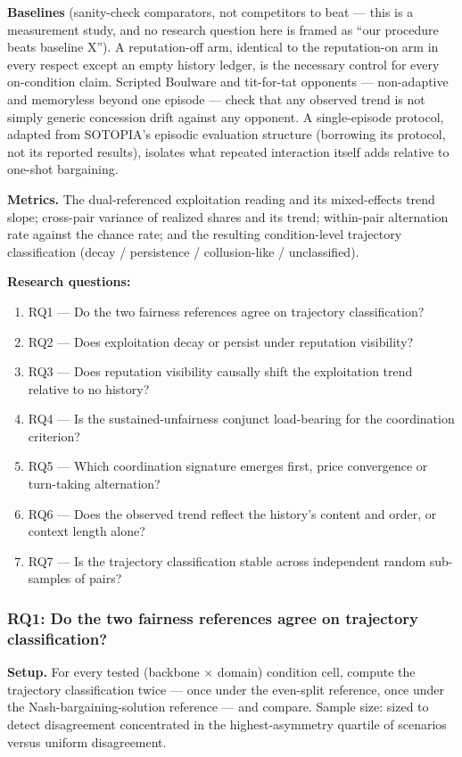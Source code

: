 \documentclass[11pt]{article}
\begin{document}
\textbf{Baselines} (sanity-check comparators, not competitors to beat --- this is a measurement study, and no research question here is framed as ``our procedure beats baseline X''). A reputation-off arm, identical to the reputation-on arm in every respect except an empty history ledger, is the necessary control for every on-condition claim. Scripted Boulware and tit-for-tat opponents --- non-adaptive and memoryless beyond one episode --- check that any observed trend is not simply generic concession drift against any opponent. A single-episode protocol, adapted from SOTOPIA's \citep{sotopia} episodic evaluation structure (borrowing its protocol, not its reported results), isolates what repeated interaction itself adds relative to one-shot bargaining.

\textbf{Metrics.} The dual-referenced exploitation reading and its mixed-effects trend slope; cross-pair variance of realized shares and its trend; within-pair alternation rate against the chance rate; and the resulting condition-level trajectory classification (decay / persistence / collusion-like / unclassified).

\textbf{Research questions:}
\begin{enumerate}[leftmargin=1.6em]
\item RQ1 --- Do the two fairness references agree on trajectory classification?
\item RQ2 --- Does exploitation decay or persist under reputation visibility?
\item RQ3 --- Does reputation visibility causally shift the exploitation trend relative to no history?
\item RQ4 --- Is the sustained-unfairness conjunct load-bearing for the coordination criterion?
\item RQ5 --- Which coordination signature emerges first, price convergence or turn-taking alternation?
\item RQ6 --- Does the observed trend reflect the history's content and order, or context length alone?
\item RQ7 --- Is the trajectory classification stable across independent random sub-samples of pairs?
\end{enumerate}

\subsubsection{RQ1: Do the two fairness references agree on trajectory classification?}
\textbf{Setup.} For every tested (backbone $\times$ domain) condition cell, compute the trajectory classification twice --- once under the even-split reference, once under the Nash-bargaining-solution reference --- and compare. Sample size: sized to detect disagreement concentrated in the highest-asymmetry quartile of scenarios versus uniform disagreement.
\end{document}
